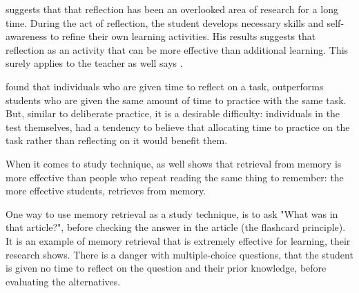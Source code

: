   \cite{stefano} suggests that that reflection has been an overlooked area of research for a long time. During the act of reflection, the student develops necessary skills and self-awareness to refine their own learning activities. His results suggests that reflection as an activity that can be more effective than additional learning. This surely applies to the teacher as well says \cite{luckin}.

  \cite{stefano} found that individuals who are given time to reflect on a task, outperforms students who are given the same amount of time to practice with the same task. But, similar to deliberate practice, it is a desirable difficulty: individuals in the test themselves, had a tendency to believe that allocating time to practice on the task rather than reflecting on it would benefit them.


  When it comes to study technique, \cite{bjork} as well shows that retrieval from memory is more effective than people who repeat reading the same thing to remember: the more effective students, retrieves from memory.

  One way to use memory retrieval as a study technique, is to ask "What was in that article?", before checking the answer in the article (the flashcard principle). It is an example of memory retrieval that is extremely effective for learning, their research shows. There is a danger with multiple-choice questions, that the student is given no time to reflect on the question and their prior knowledge, before evaluating the alternatives.





%
